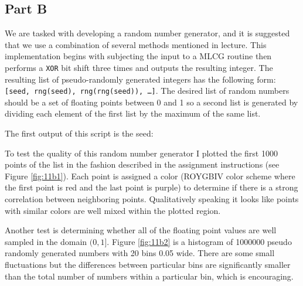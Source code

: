 \subsection{Part B}

We are tasked with developing a random number generator, and it is suggested that we use a combination of several methods mentioned in lecture. This implementation begins with subjecting the input to a MLCG routine then performs a \texttt{XOR} bit shift three times and outputs the resulting integer. The resulting list of pseudo-randomly generated integers has the following form: \texttt{[seed, rng(seed), rng(rng(seed)), \dots]}. The desired list of random numbers should be a set of floating points between 0 and 1 so a second list is generated by dividing each element of the first list by the maximum of the same list.



The first output of this script is the seed: 



To test the quality of this random number generator I plotted the first 1000 points of the list in the fashion described in the assignment instructions (see Figure \ref{fig:11b1}). Each point is assigned a color (ROYGBIV color scheme where the first point is red and the last point is purple) to determine if there is a strong correlation between neighboring points. Qualitatively speaking it looks like points with similar colors are well mixed within the plotted region.

Another test is determining whether all of the floating point values are well sampled in the domain $(0,1]$. Figure \ref{fig:11b2} is a histogram of 1000000 pseudo randomly generated numbers with 20 bins 0.05 wide. There are some small fluctuations but the differences between particular bins are significantly smaller than the total number of numbers within a particular bin, which is encouraging.
